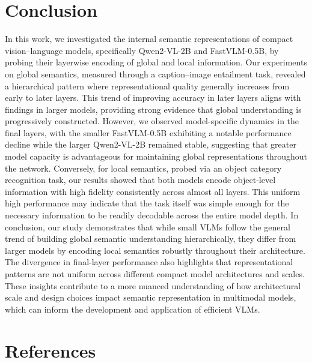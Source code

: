 \documentclass[11pt]{article}
\begin{document}
\section{Conclusion}
In this work, we investigated the internal semantic representations of compact vision--language models, specifically Qwen2-VL-2B and FastVLM-0.5B, by probing their layerwise encoding of global and local information. Our experiments on global semantics, measured through a caption--image entailment task, revealed a hierarchical pattern where representational quality generally increases from early to later layers. This trend of improving accuracy in later layers aligns with findings in larger models, providing strong evidence that global understanding is progressively constructed. However, we observed model-specific dynamics in the final layers, with the smaller FastVLM-0.5B exhibiting a notable performance decline while the larger Qwen2-VL-2B remained stable, suggesting that greater model capacity is advantageous for maintaining global representations throughout the network.
Conversely, for local semantics, probed via an object category recognition task, our results showed that both models encode object-level information with high fidelity consistently across almost all layers. This uniform high performance may indicate that the task itself was simple enough for the necessary information to be readily decodable across the entire model depth. In conclusion, our study demonstrates that while small VLMs follow the general trend of building global semantic understanding hierarchically, they differ from larger models by encoding local semantics robustly throughout their architecture. The divergence in final-layer performance also highlights that representational patterns are not uniform across different compact model architectures and scales. These insights contribute to a more nuanced understanding of how architectural scale and design choices impact semantic representation in multimodal models, which can inform the development and application of efficient VLMs.

\section{References}


\nocite{*}
\appendix
\end{document}
